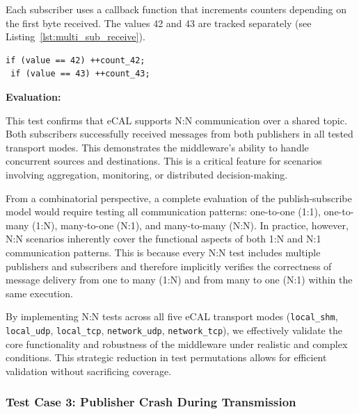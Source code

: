 Each subscriber uses a callback function that increments counters depending on the first byte received. The values 42 and 43 are tracked separately (see Listing~\ref{lst:multi_sub_receive}).
\vspace{0.5em}
\begin{lstlisting}[style=cppstyle, caption={Subscriber callback counting 42 and 43}, label={lst:multi_sub_receive}, captionpos=b]
 if (value == 42) ++count_42;
 if (value == 43) ++count_43;
\end{lstlisting}

\vspace{0.5em}
\textbf{Evaluation:}

\vspace{0.4em}
This test confirms that eCAL supports N:N communication over a shared topic. Both subscribers successfully received messages from both publishers in all tested transport modes. This demonstrates the middleware's ability to handle concurrent sources and destinations. This is a critical feature for scenarios involving aggregation, monitoring, or distributed decision-making.

\vspace{1em}
From a combinatorial perspective, a complete evaluation of the publish-subscribe model would require testing all communication patterns: one-to-one (1:1), one-to-many (1:N), many-to-one (N:1), and many-to-many (N:N). In practice, however, N:N scenarios inherently cover the functional aspects of both 1:N and N:1 communication patterns. This is because every N:N test includes multiple publishers and subscribers and therefore implicitly verifies the correctness of message delivery from one to many (1:N) and from many to one (N:1) within the same execution.

\vspace{1em}
By implementing N:N tests across all five eCAL transport modes (\texttt{local\_shm}, \texttt{local\_udp}, \texttt{local\_tcp}, \texttt{network\_udp}, \texttt{network\_tcp}), we effectively validate the core functionality and robustness of the middleware under realistic and complex conditions. This strategic reduction in test permutations allows for efficient validation without sacrificing coverage.

\vspace{1em}
\vspace{1em}
\subsubsection*{Test Case 3: Publisher Crash During Transmission}


